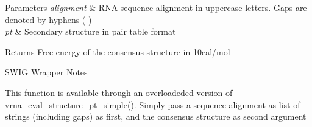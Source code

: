 \begin{DoxyParams}{Parameters}
{\em alignment} & R\+NA sequence alignment in uppercase letters. Gaps are denoted by hyphens (\textquotesingle{}-\/\textquotesingle{}) \\
\hline
{\em pt} & Secondary structure in pair table format \\
\hline
\end{DoxyParams}
\begin{DoxyReturn}{Returns}
Free energy of the consensus structure in 10cal/mol
\end{DoxyReturn}
\begin{DoxyRefDesc}{S\+W\+I\+G Wrapper Notes}
\item[\hyperlink{wrappers__wrappers000060}{S\+W\+I\+G Wrapper Notes}]This function is available through an overloadeded version of \hyperlink{group__eval_ga0bba59b4d6e53461088666ff4aece7b0}{vrna\+\_\+eval\+\_\+structure\+\_\+pt\+\_\+simple()}. Simply pass a sequence alignment as list of strings (including gaps) as first, and the consensus structure as second argument \end{DoxyRefDesc}
